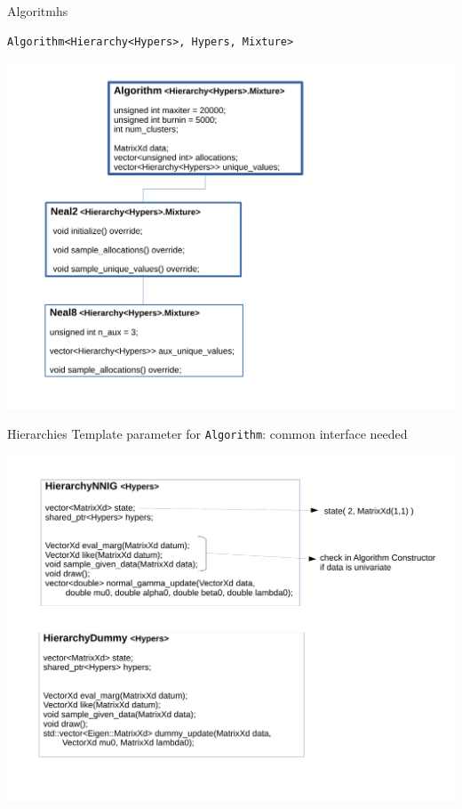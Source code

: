 

\begin{frame}[fragile]{Algoritmhs}
\begin{verbatim}
Algorithm<Hierarchy<Hypers>, Hypers, Mixture>
\end{verbatim}
\begin{center}
	\includegraphics[scale=0.35]{etc/algo.pdf}
\end{center}
\end{frame}

\begin{frame}{Hierarchies}
Template parameter for \texttt{Algorithm}: common interface needed
\begin{center}
	\includegraphics[scale=0.35]{etc/hierarchy.pdf}
\end{center}

\end{frame}

